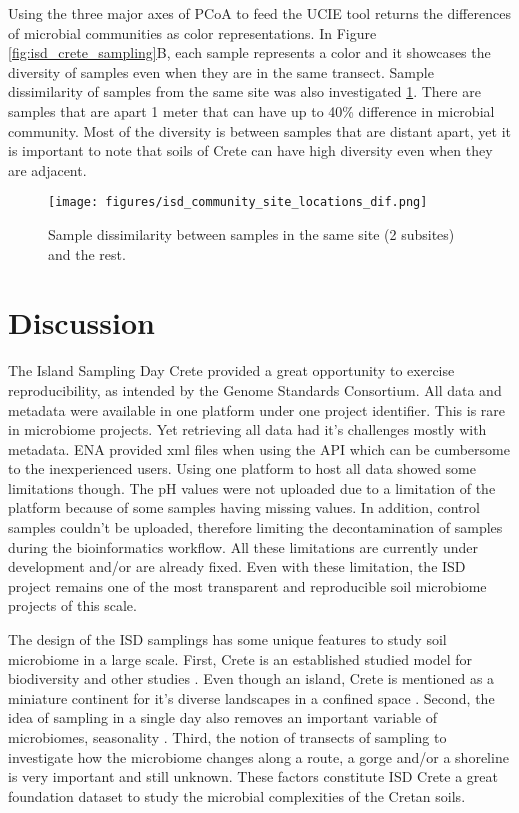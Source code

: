 Using the three major axes of PCoA to feed the UCIE tool \parencite{Koutrouli2022} returns the differences 
of microbial communities as color representations. In Figure \ref{fig:isd_crete_sampling}B, each 
sample represents a color and it showcases the diversity of samples even when they are 
in the same transect. Sample dissimilarity of samples from the same site was also investigated \ref{fig:isd_site_locations}.
There are samples that are apart 1 meter that can have up to 40\% difference in
microbial community. Most of the diversity is between samples that are distant apart,
yet it is important to note that soils of Crete can have high diversity even when they 
are adjacent. 

\begin{figure}[hbt!] 
    \centering\texttt{[image: figures/isd\_community\_site\_locations\_dif.png]}
\caption{Sample dissimilarity between samples in the same site (2 subsites) and the rest.}
    \label{fig:isd_site_locations}
\end{figure}


\section{Discussion}\label{isd_discussion}

The Island Sampling Day Crete provided a great opportunity to 
exercise reproducibility, as intended by the Genome Standards Consortium.
All data and metadata were available in one platform
under one project identifier. This is rare in microbiome projects. Yet retrieving
all data had it's challenges mostly with metadata. ENA provided xml files when 
using the API which can be cumbersome to the inexperienced users. 
Using one platform to host all data showed some limitations though. The pH values
were not uploaded due to a limitation of the platform because of some samples 
having missing values. In addition, control samples couldn't be uploaded,
therefore limiting the decontamination of samples during the bioinformatics workflow.
All these limitations are currently under development and/or are already fixed. 
Even with these limitation, the ISD project remains one of the most transparent
and reproducible soil microbiome projects of this scale.

The design of the ISD samplings has some unique features to study soil microbiome 
in a large scale. First, Crete is an established studied model for biodiversity and 
other studies \parencite{Vogiatzakis2008_crete}. Even though an island,
Crete is mentioned as a miniature continent for it's diverse landscapes in a 
confined space \parencite{Vogiatzakis_land_2017}. Second, the idea of sampling in a single day 
also removes an important variable of microbiomes, seasonality \parencite{Chase2021}.
Third, the notion of transects of sampling to investigate how the microbiome changes
along a route, a gorge and/or a shoreline is very important and still unknown.
These factors constitute ISD Crete a great foundation dataset to study the microbial complexities
of the Cretan soils.

